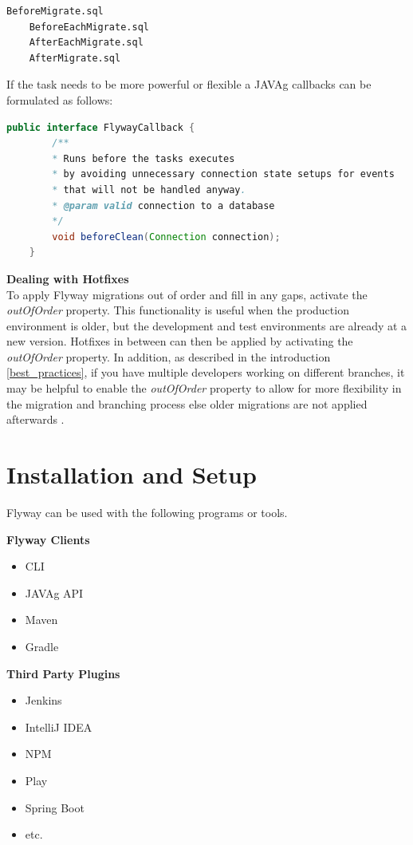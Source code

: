 \begin{lstlisting}[caption=SQL Callback Functions for Flyway - Source: \cite{FlywayCallbacks}]
	BeforeMigrate.sql
	BeforeEachMigrate.sql
	AfterEachMigrate.sql
	AfterMigrate.sql
\end{lstlisting}

If the task needs to be more powerful or flexible a \gls{JAVAg} callbacks can be formulated as follows:
\begin{lstlisting}[language=Java, caption=Java Callback Functions before clean - Source: \cite{FlywayCallbacks}]
	public interface FlywayCallback {
		/**
		* Runs before the tasks executes
		* by avoiding unnecessary connection state setups for events 
		* that will not be handled anyway.
		* @param valid connection to a database
		*/
		void beforeClean(Connection connection);
	}
\end{lstlisting}

\textbf{Dealing with Hotfixes}\\
To apply Flyway migrations out of order and fill in any gaps, activate the \textit{outOfOrder} property. This functionality is useful when the production environment is older, but the development and test environments are already at a new version. Hotfixes in between can then be applied by activating the \textit{outOfOrder} property. In addition, as described in the introduction \autoref{best_practices}, if you have multiple developers working on different branches, it may be helpful to enable the \textit{outOfOrder} property to allow for more flexibility in the migration and branching process else older migrations are not applied afterwards  \cite{Lukonin2017}.


\section{Installation and Setup}
%
Flyway can be used with the following programs or tools.

\begin{minipage}[t]{0.5\textwidth}
\textbf{Flyway Clients}

\begin{itemize}
	\item \Gls{CLI}
	\item \gls{JAVAg} \acrshort{API}
	\item Maven
	\item Gradle
\end{itemize}
\end{minipage}
\begin{minipage}[t]{0.5\textwidth}
	\textbf{Third Party Plugins}
	\begin{itemize}
		\item Jenkins
		\item IntelliJ IDEA
		\item NPM
		\item Play
		\item Spring Boot
		\item etc.
	\end{itemize}
\end{minipage}
\vspace{0.3cm}

